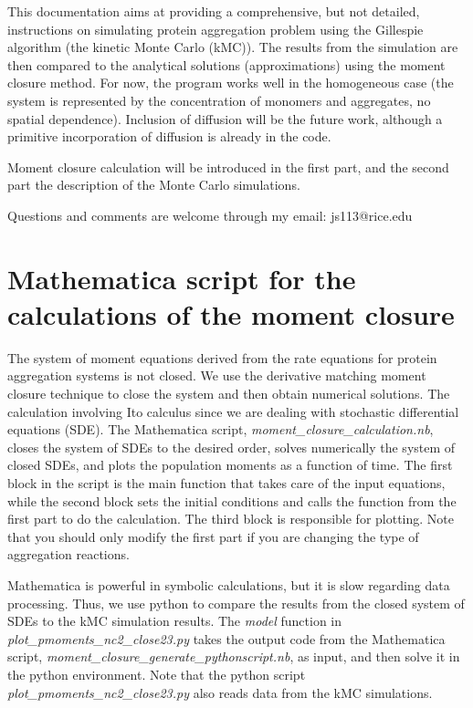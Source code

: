 \documentclass[12pt]{article}
\title{}
\author{Ace Shen}
\begin{document}
\maketitle
This documentation aims at providing a comprehensive, but not detailed, instructions on simulating protein aggregation problem using the Gillespie algorithm (the kinetic Monte Carlo (kMC)). The results from the simulation are then compared to the analytical solutions (approximations) using the moment closure method. For now, the program works well in the homogeneous case (the system is represented by the concentration of monomers and aggregates, no spatial dependence). Inclusion of diffusion will be the future work, although a primitive incorporation of diffusion is already in the code.

Moment closure calculation will be introduced in the first part, and the second part the description of the Monte Carlo simulations. 

Questions and comments are welcome through my email: js113@rice.edu


\section*{Mathematica script for the calculations of the moment closure}

The system of moment equations derived from the rate equations for protein aggregation systems is not closed. We use the derivative matching moment closure technique to close the system and then obtain numerical solutions. The calculation involving Ito calculus since we are dealing with stochastic differential equations (SDE). The Mathematica script, \textit{moment\_closure\_calculation.nb}, closes the system of SDEs to the desired order, solves numerically the system of closed SDEs, and plots the population moments as a function of time. The first block in the script is the main function that takes care of the input equations, while the second block sets the initial conditions and calls the function from the first part to do the calculation. The third block is responsible for plotting. Note that you should only modify the first part if you are changing the type of aggregation reactions.

Mathematica is powerful in symbolic calculations, but it is slow regarding data processing. Thus, we use python to compare the results from the closed system of SDEs to the kMC simulation results. The \textit{model} function in \textit{plot\_pmoments\_nc2\_close23.py} takes the output code from the Mathematica script, \textit{moment\_closure\_generate\_pythonscript.nb}, as input, and then solve it in the python environment. Note that the python script \textit{plot\_pmoments\_nc2\_close23.py} also reads data from the kMC simulations.
\end{document}
